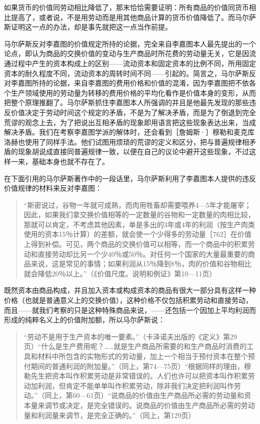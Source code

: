 如果货币的价值同劳动相比降低了，那末恰恰需要证明：所有商品的价值同货币相比提高了，或者说，不是用劳动而是用其他商品计算的货币价值降低了。而马尔萨斯证明这一点的办法，却是事先就把这一点当作前提。


马尔萨斯反对李嘉图的价值规定所持的论据，完全来自李嘉图本人最先提出的一个论点，即认为商品的交换价值的变动与生产商品时所花费的劳动量无关，它是因流通过程中产生的资本构成上的区别——流动资本和固定资本的比例不同，所用固定资本的耐久程度不同，流动资本的周转时间不同——引起的。简言之，马尔萨斯反对李嘉图所持的论据，来自李嘉图的费用价格和价值的混淆，因为李嘉图把不依各个生产领域使用的劳动量为转移的费用价格的平均化看作是价值本身的变形，从而把整个原理推翻了。马尔萨斯抓住李嘉图本人所强调的并且是他最先发现的那些违反价值决定于劳动时间这个规定的矛盾，不是为了解决矛盾，而是为了倒退到完全荒谬的观念上去，为了把说出互相矛盾的现象即用语言把这些现象表达出来，当成解决矛盾。我们在考察李嘉图学派的解体时，还会看到［詹姆斯·］穆勒和麦克库洛赫也使用了同样手法。他们试图用烦琐的荒谬的定义和区分，把与普遍规律相矛盾的现象胡说成直接同普遍规律一致，以便在自己的议论中避开这些现象，不过这样一来，基础本身也就不存在了。

在下面引用的马尔萨斯著作中的一段话里，马尔萨斯利用了李嘉图本人提供的违反价值规律的材料来反对李嘉图：

\begin{quote}{“斯密说过，谷物一年就可成熟，而肉用牲畜却需要喂养4—5年才能屠宰；因此，如果我们拿交换价值相等的一定数量的谷物和一定数量的肉相比较，那就可以肯定，不考虑其他因素，单是多出的3年或4年的利润（按生产肉类使用的资本15％计算）的差额，就会使一个少得多的劳动量［762］在价值上得到补偿。可见，两个商品的交换价值可以相等，而一个商品中的积累劳动和直接劳动却比另一个少40％或50％。对任何一个国家的大量最重要的商品来说，这是常见的事情；如果利润从15％降到8％，肉的价值和谷物相比就会降低20％以上。”（《价值尺度。说明和例证》第10—11页）}\end{quote}

既然资本由商品构成，并且加入资本或构成资本的商品有很大一部分具有这样一种价格（也就是普通意义上的交换价值），这种价格不仅包括积累劳动和直接劳动，而且——就我们考察的只是这种特殊商品来说，——还包括一个因加上平均利润而形成的纯粹名义上的价值附加额，所以马尔萨斯说：

\begin{quote}{“劳动不是用于生产资本的唯一要素。”（卡泽诺夫出版的《定义》第29页）“什么是生产费用呢？……就是生产商品所需要的和生产商品时消费的工具和材料中所包含的实物形式的劳动量，加上一个相当于预付资本在整个预付期间的普通利润的附加量。”（同上，第74—75页）“根据同样的理由，穆勒先生把资本叫作积累劳动是非常错误的。人们也许可以把资本叫作积累劳动加利润，但肯定不能单单叫作积累劳动，除非我们决定把利润叫作劳动。”（同上，第60—61页）“说商品的价值由生产商品所必需的劳动量和资本量来调节或决定，是完全错误的。说商品的价值由生产商品所必需的劳动量和利润量来调节，是完全正确的。”（同上，第129页）}\end{quote}

